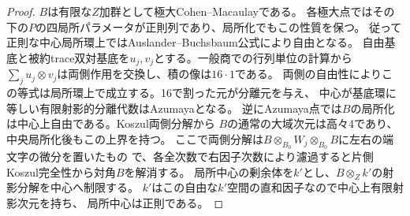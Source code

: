 \begin{proof}
$B$は有限な$Z$加群として極大Cohen--Macaulayである。
各極大点ではその下の$P$の四局所パラメータが正則列であり、局所化でもこの性質を保つ。
従って正則な中心局所環上ではAuslander--Buchsbaum公式により自由となる。
自由基底と被約trace双対基底を$u_j,v_j$とする。一般商での行列単位の計算から
$\sum_j u_j\otimes v_j$は両側作用を交換し、積の像は$16\cdot1$である。
両側の自由性によりこの等式は局所環上で成立する。16で割った元が分離元を与え、
中心が基底環に等しい有限射影的分離代数はAzumayaとなる。
逆にAzumaya点では$B$の局所化は中心上自由である。Koszul両側分解から
$B$の通常の大域次元は高々4であり、中央局所化後もこの上界を持つ。
ここで両側分解は$B\otimes_{B_0}W_j\otimes_{B_0}B$に左右の端文字の微分を置いたもの
で、各全次数で右因子次数により濾過すると片側Koszul完全性から対角$B$を解消する。
局所中心の剰余体を$k'$とし、$B\otimes_Z k'$の射影分解を中心へ制限する。
$k'$はこの自由な$k'$空間の直和因子なので中心上有限射影次元を持ち、
局所中心は正則である。
\end{proof}

